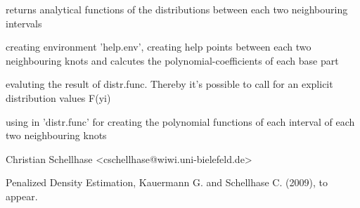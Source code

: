 \begin{Value}
\begin{ldescription}
\item[\code{distr.func}] returns analytical functions of the distributions between each two neighbouring intervals
\item[\code{distr.func.help}] creating environment 'help.env', creating help points between each two neighbouring knots and calcutes the polynomial-coefficients of each base part
\item[\code{cal.int}] evaluting the result of distr.func. Thereby it's possible to call for an explicit distribution values F(yi)
\item[\code{poly.part}] using in 'distr.func' for creating the polynomial functions of each interval of each two neighbouring knots
\end{ldescription}
\end{Value}
\begin{Author}\relax
Christian Schellhase <cschellhase@wiwi.uni-bielefeld.de>
\end{Author}
\begin{References}\relax
Penalized Density Estimation, Kauermann G. and Schellhase C. (2009), to appear.
\end{References}

